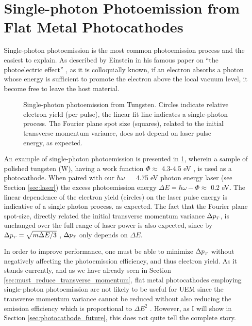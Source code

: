 \section{Single-photon Photoemission from Flat Metal Photocathodes}

Single-photon photoemission is the most common photoemission process and the easiest to explain.
As described by Einstein in his famous paper on ``the photoelectric effect'' \cite{einstein_uber_1905}, as it is colloquially known, if an electron absorbs a photon whose energy is sufficient to promote the electron above the local vacuum level, it become free to leave the host material.

\begin{figure}
  \centering
  
  \caption[Single-photon photoemission from Tungsten]{
    Single-photon photoemission from Tungsten.
    Circles indicate relative electron yield (per pulse), the linear fit line indicates a single-photon process.
    The Fourier plane spot size (squares), related to the initial transverse momentum variance, does not depend on laser pulse energy, as expected.
  }
  \label{fig:single_photon_tungsten}
\end{figure}

An example of single-photon photoemission is presented in \ref{fig:single_photon_tungsten}, wherein a sample of polished tungsten (W), having a work function $\Phi \approx $ 4.3-4.5 eV \cite{yen_thermally_1980}, is used as a photocathode.
When paired with our $\hbar \omega = $ 4.75 eV photon energy laser (see Section \ref{sec:laser}) the excess photoemission energy $\Delta E = \hbar \omega - \Phi \approx $ 0.2 eV.
The linear dependence of the electron yield (circles) on the laser pulse energy is indicative of a single photon process, as expected.
The fact that the Fourier plane spot-size, directly related the initial transverse momentum variance $\Delta p_{{\scriptscriptstyle T}}$, is unchanged over the full range of laser power is also expected, since by $\Delta p_{{\scriptscriptstyle T}} = \sqrt{ m \Delta E / 3 } $ \cite{dowell_quantum_2009}, $\Delta p_{{\scriptscriptstyle T}}$ only depends on $\Delta E$.

In order to improve performance, one must be able to minimize $\Delta p_{{\scriptscriptstyle T}}$ without negatively affecting the photoemission efficiency, and thus electron yield.
As it stands currently, and as we have already seen in Section \ref{sec:must_reduce_transverse_momentum}, flat metal photocathodes employing single-photon photoemission are not likely to be useful for UEM since the transverse momentum variance cannot be reduced without also reducing the emission efficiency which is proportional to $\Delta E^2$ \cite{shalaev_electron_1994}.
However, as I will show in Section \ref{sec:photocathode_future}, this does not quite tell the complete story.

